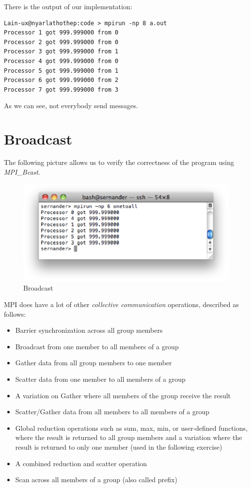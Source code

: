 There is the output of our implementation:

\begin{verbatim}
Lain-ux@nyarlathothep:code > mpirun -np 8 a.out 
Processor 1 got 999.999000 from 0
Processor 2 got 999.999000 from 0
Processor 3 got 999.999000 from 1
Processor 4 got 999.999000 from 0
Processor 5 got 999.999000 from 1
Processor 6 got 999.999000 from 2
Processor 7 got 999.999000 from 3
\end{verbatim}

As we can see, not everybody send messages.

\section{Broadcast}

The following picture allows us to verify the correctness of the program using \textit{MPI\_Bcast}.
\begin{figure}[!h]
\begin{center}
	\includegraphics[width=\textwidth]{pic/bcast.eps}
	\caption{Broadcast}
\end{center}
\end{figure}

MPI does have a lot of other \textit{collective communication} operations, described as follows:

\begin{itemize}
	\item Barrier synchronization across all group members
	\item Broadcast from one member to all members of a group
	\item Gather data from all group members to one member 
	\item Scatter data from one member to all members of a group
	\item A variation on Gather where all members of the group receive the result
	\item Scatter/Gather data from all members to all members of a group
	\item Global reduction operations such as sum, max, min, or user-defined functions, where the result is returned to all group members and a variation where the result is returned to only one member (used in the following exercise) 
	\item A combined reduction and scatter operation
	\item Scan across all members of a group (also called prefix)
\end{itemize}
